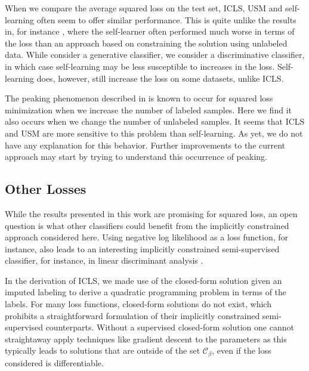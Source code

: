 \documentclass[twoside]{memoir}\usepackage[]{graphicx}\usepackage{xcolor}
\newcommand{\Cb}{\mathcal{C}_{\beta}}
\begin{document}
When we compare the average squared loss on the test set, ICLS, USM and self-learning often seem to offer similar performance. This is quite unlike the results in, for instance \citep{Loog2010,Loog2014b}, where the self-learner often performed much worse in terms of the loss than an approach based on constraining the solution using unlabeled data. While \citet{Loog2010,Loog2014b} consider a generative classifier, we consider a discriminative classifier, in which case self-learning may be less susceptible to increases in the loss. Self-learning does, however, still increase the loss on some datasets, unlike ICLS.

The peaking phenomenon described in \citep{Opper1995,Raudys1998} is known to occur for squared loss minimization when we increase the number of labeled samples. Here we find it also occurs when we change the number of unlabeled samples. It seems that ICLS and USM are more sensitive to this problem than self-learning. As yet, we do not have any explanation for this behavior. Further improvements to the current approach may start by trying to understand this occurrence of peaking.

\subsection*{Other Losses}
While the results presented in this work are promising for squared loss, an open question is what other classifiers could benefit from the implicitly constrained approach considered here. Using negative log likelihood as a loss function, for instance, also leads to an interesting implicitly constrained semi-supervised classifier, for instance, in linear discriminant analysis \citep{Krijthe2014}. 

In the derivation of ICLS, we made use of the closed-form solution given an imputed labeling to derive a quadratic programming problem in terms of the labels. For many loss functions, closed-form solutions do not exist, which prohibits a straightforward formulation of their implicitly constrained semi-supervised counterparts. Without a supervised closed-form solution one cannot straightaway apply techniques like gradient descent to the parameters as this typically leads to solutions that are outside of the set $\Cb$, even if the loss considered is differentiable.
\end{document}
